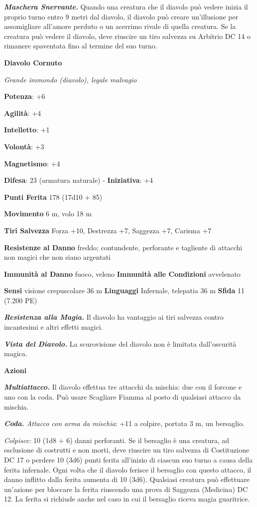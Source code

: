 \begin{multicols}{2}
\emph{\textbf{Maschera Snervante.}} Quando una creatura che il diavolo
può vedere inizia il proprio turno entro 9 metri dal diavolo, il diavolo
può creare un'illusione per assomigliare all'amore perduto o un acerrimo
rivale di quella creatura. Se la creatura può vedere il diavolo, deve
riuscire un tiro salvezza su Arbitrio DC 14 o rimanere spaventata fino
al termine del suo turno.

\textbf{Diavolo Cornuto}

\emph{Grande immondo (diavolo), legale malvagio}

\textbf{Potenza}: +6

\textbf{Agilità}: +4

\textbf{Intelletto}: +1

\textbf{Volontà}: +3

\textbf{Magnetismo}: +4

\textbf{Difesa}: 23 (armatura naturale) - \textbf{Iniziativa}: +4

\textbf{Punti Ferita} 178 (17d10 + 85)

\textbf{Movimento} 6 m, volo 18 m

\textbf{Tiri Salvezza} Forza +10, Destrezza +7, Saggezza +7, Carisma +7

\textbf{Resistenze al Danno} freddo; contundente, perforante e tagliente
di attacchi non magici che non siano argentati

\textbf{Immunità al Danno} fuoco, veleno \textbf{Immunità alle
Condizioni} avvelenato

\textbf{Sensi} visione crepuscolare 36 m
\textbf{Linguaggi} Infernale, telepatia 36 m \textbf{Sfida} 11 (7.200
PE)

\emph{\textbf{Resistenza alla Magia.}} Il diavolo ha vantaggio ai tiri
salvezza contro incantesimi e altri effetti magici.

\emph{\textbf{Vista del Diavolo.}} La scurovisione del diavolo non è
limitata dall'oscurità magica.

\textbf{Azioni}

\emph{\textbf{Multiattacco.}} Il diavolo effettua tre attacchi da
mischia: due con il forcone e uno con la coda. Può usare Scagliare
Fiamma al posto di qualsiasi attacco da mischia.

\emph{\textbf{Coda.} Attacco con arma da mischia}: +11 a colpire,
portata 3 m, un bersaglio.

\emph{Colpisce:} 10 (1d8 + 6) danni perforanti. Se il bersaglio è una
creatura, ad esclusione di costrutti e non morti, deve riuscire un tiro
salvezza di Costituzione DC 17 o perdere 10 (3d6) punti ferita
all'inizio di ciascun suo turno a causa della ferita infernale. Ogni
volta che il diavolo ferisce il bersaglio con questo attacco, il danno
inflitto dalla ferita aumenta di 10 (3d6). Qualsiasi creatura può
effettuare un'azione per bloccare la ferita riuscendo una prova di
Saggezza (Medicina) DC 12. La ferita si richiude anche nel caso in cui
il bersaglio riceva magia guaritrice.


\end{multicols}
